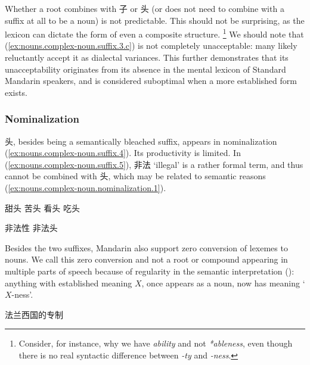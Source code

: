 \documentclass[UTF8, a4paper, oneside, scheme=plain, 12pt]{ctexrep}
\newcommand{\form}[1]{\emph{#1}}
\newcommand{\translate}[1]{`#1'}
\begin{document}
Whether a root combines with 子 or 头 (or does not need to combine with a suffix at all to be a noun) is not predictable.
This should not be surprising, as the lexicon can dictate the form of even a composite structure.%
\footnote{
    Consider, for instance, why we have \form{ability} and not \form{*ableness},
    even though there is no real syntactic difference between \form{-ty} and \form{-ness}.
}
We should note that (\ref{ex:nouns.complex-noun.suffix.3.c}) is not completely unacceptable:
many likely reluctantly accept it as dialectal variances.
This further demonstrates that its unacceptability originates from 
its absence in the mental lexicon of Standard Mandarin speakers,
and is considered suboptimal when a more established form exists.

\subsubsection{Nominalization}

头, besides being a semantically bleached suffix,
appears in nominalization (\ref{ex:nouns.complex-noun.suffix.4}).
Its productivity is limited. 
In (\ref{ex:nouns.complex-noun.suffix.5}),
非法 \translate{illegal} is a rather formal term,
and thus cannot be combined with 头,
which may be related to semantic reasons (\ref{ex:nouns.complex-noun.nominalization.1}).

\begin{exe}
    \ex\label{ex:nouns.complex-noun.suffix.4}
    \begin{xlist}
        \ex 甜头
        \ex 苦头
        \ex 看头
        \ex 吃头
    \end{xlist}
    
    \ex\label{ex:nouns.complex-noun.suffix.5} \begin{xlist}
        \ex 非法性
        \ex *非法头
    \end{xlist}
\end{exe}

Besides the two suffixes, Mandarin also support zero conversion of lexemes to nouns.
We call this zero conversion and not a root or compound appearing in multiple parts of speech
because of regularity in the semantic interpretation ():
anything with established meaning $X$, once appears as a noun,
now has meaning \translate{$X$-ness}.

\begin{exe}
    \ex 法兰西国的专制
\end{exe}
\end{document}
